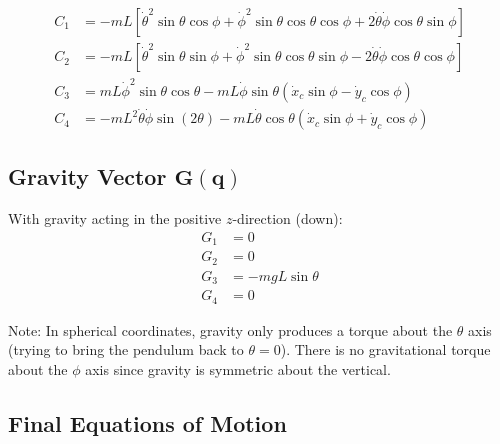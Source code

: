 \documentclass[12pt]{article}
\begin{document}
\begin{align}
    C_1 &= -mL\left[\dot{\theta}^2\sin\theta\cos\phi + \dot{\phi}^2\sin\theta\cos\theta\cos\phi + 2\dot{\theta}\dot{\phi}\cos\theta\sin\phi\right] \\
    C_2 &= -mL\left[\dot{\theta}^2\sin\theta\sin\phi + \dot{\phi}^2\sin\theta\cos\theta\sin\phi - 2\dot{\theta}\dot{\phi}\cos\theta\cos\phi\right] \\
    C_3 &= mL\dot{\phi}^2\sin\theta\cos\theta - mL\dot{\phi}\sin\theta(\dot{x}_c\sin\phi - \dot{y}_c\cos\phi) \\
    C_4 &= -mL^2\dot{\theta}\dot{\phi}\sin(2\theta) - mL\dot{\theta}\cos\theta(\dot{x}_c\sin\phi + \dot{y}_c\cos\phi)
\end{align}

\subsection{Gravity Vector $\mathbf{G}(\mathbf{q})$}

With gravity acting in the positive $z$-direction (down):
\begin{align}
    G_1 &= 0 \\
    G_2 &= 0 \\
    G_3 &= -mgL\sin\theta \\
    G_4 &= 0
\end{align}

Note: In spherical coordinates, gravity only produces a torque about the $\theta$ axis (trying to bring the pendulum back to $\theta = 0$). There is no gravitational torque about the $\phi$ axis since gravity is symmetric about the vertical.

\subsection{Final Equations of Motion}
\end{document}
